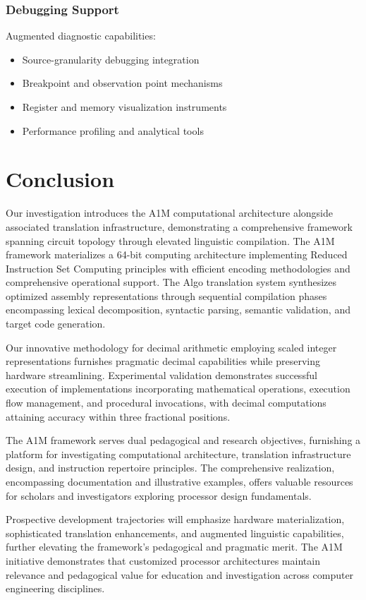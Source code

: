\documentclass[conference,10pt,twocolumn]{IEEEtran}
\begin{document}
\subsubsection{Debugging Support}
Augmented diagnostic capabilities:
\begin{itemize}
\item Source-granularity debugging integration
\item Breakpoint and observation point mechanisms
\item Register and memory visualization instruments
\item Performance profiling and analytical tools
\end{itemize}

\section{Conclusion}

Our investigation introduces the A1M computational architecture alongside associated translation infrastructure, demonstrating a comprehensive framework spanning circuit topology through elevated linguistic compilation. The A1M framework materializes a 64-bit computing architecture implementing Reduced Instruction Set Computing principles with efficient encoding methodologies and comprehensive operational support. The Algo translation system synthesizes optimized assembly representations through sequential compilation phases encompassing lexical decomposition, syntactic parsing, semantic validation, and target code generation.

Our innovative methodology for decimal arithmetic employing scaled integer representations furnishes pragmatic decimal capabilities while preserving hardware streamlining. Experimental validation demonstrates successful execution of implementations incorporating mathematical operations, execution flow management, and procedural invocations, with decimal computations attaining accuracy within three fractional positions.

The A1M framework serves dual pedagogical and research objectives, furnishing a platform for investigating computational architecture, translation infrastructure design, and instruction repertoire principles. The comprehensive realization, encompassing documentation and illustrative examples, offers valuable resources for scholars and investigators exploring processor design fundamentals.

Prospective development trajectories will emphasize hardware materialization, sophisticated translation enhancements, and augmented linguistic capabilities, further elevating the framework's pedagogical and pragmatic merit. The A1M initiative demonstrates that customized processor architectures maintain relevance and pedagogical value for education and investigation across computer engineering disciplines.
\end{document}
